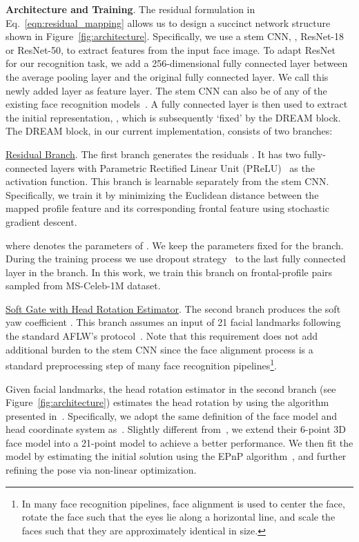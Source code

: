 \documentclass[10pt,twocolumn,letterpaper]{article}
\begin{document}
\noindent
\textbf{Architecture and Training}.
The residual formulation in Eq.~\eqref{eqn:residual_mapping} allows us to design a succinct network structure shown in Figure~\ref{fig:architecture}. Specifically, we use a stem CNN, \eg, ResNet-18 or ResNet-50, to extract features from the input face image. 
To adapt ResNet~\cite{he2016deep} for our recognition task, we add a 256-dimensional fully connected layer between the average pooling layer and the original fully connected layer. We call this newly added layer as feature layer.
The stem CNN can also be of any of the existing face recognition models~\cite{sun2014deep,schroff2015facenet,wen2016discriminative}.
A fully connected layer is then used to extract the initial representation, , which is subsequently `fixed' by the DREAM block. 
The DREAM block, in our current implementation, consists of two branches: 

\vspace{0.1cm}
\noindent
\underline{Residual Branch}. The first branch generates the residuals . It has two fully-connected layers with Parametric Rectified Linear Unit (PReLU)~\cite{he2015delving} as the activation function. 
This branch is learnable separately from the stem CNN. 
Specifically, we train it by minimizing the Euclidean distance between the mapped profile feature and its corresponding frontal feature using stochastic gradient descent.

where  denotes the parameters of . We keep the parameters fixed for the  branch.
During the training process we use dropout strategy~\cite{srivastava2014dropout} to the last fully connected layer in the branch. In this work, we train this branch on frontal-profile pairs sampled from MS-Celeb-1M dataset.

\vspace{0.1cm}
\noindent
\underline{Soft Gate with Head Rotation Estimator}. 
The second branch produces the soft yaw coefficient . 
This branch assumes an input of 21 facial landmarks following the standard AFLW's protocol~\cite{koestinger2011annotated}.
Note that this requirement does not add additional burden to the stem CNN since the face alignment process is a standard preprocessing step of many face recognition pipelines\footnote{In many face recognition pipelines, face alignment is used to center the face, rotate the face such that the eyes lie along a horizontal line, and scale the faces such that they are approximately identical in size.}. 

Given facial landmarks, the head rotation estimator in the second branch (see Figure~\ref{fig:architecture}) estimates the head rotation by using the algorithm presented in~\cite{zhang2015appearance}. Specifically, we adopt the same definition of the face model and head coordinate system as~\cite{sugano2014learning}. Slightly different from~\cite{zhang2015appearance}, we extend their 6-point 3D face model into a 21-point model to achieve a better performance. We then fit the model by estimating the initial solution using the EPnP algorithm~\cite{lepetit2009epnp}, and further refining the pose via non-linear optimization.
\end{document}
